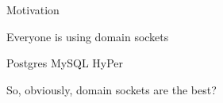 
\begin{slide}{Motivation}
  \large
  \pause

  Everyone is using domain sockets
  \pause
  \vspace{0.7cm}

  \Large
  Postgres
  \hspace{0.5cm}
  MySQL
  \pause
  \hspace{0.5cm}
  HyPer

  \pause
  \large
  \vspace{1cm}
  So, obviously, domain sockets are the best?
\end{slide}
